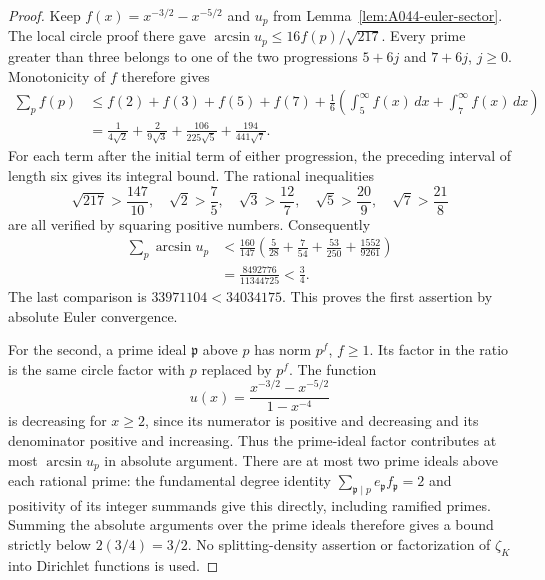 \begin{proof}
Keep \(f(x)=x^{-3/2}-x^{-5/2}\) and \(u_p\) from
Lemma~\ref{lem:A044-euler-sector}. The local circle proof there
gave \(\arcsin u_p\le16f(p)/\sqrt{217}\).
Every prime greater than three belongs to one of the two
progressions \(5+6j\) and \(7+6j\), \(j\ge0\).
Monotonicity of \(f\) therefore gives
\[
 \begin{aligned}
 \sum_p f(p)
 &\le f(2)+f(3)+f(5)+f(7)
        +\frac16\left(\int_5^\infty f(x)\,dx
                       +\int_7^\infty f(x)\,dx\right)\\
 &=\frac1{4\sqrt2}+\frac2{9\sqrt3}
          +\frac{106}{225\sqrt5}+\frac{194}{441\sqrt7}.
 \end{aligned}
\]
For each term after the initial term of either progression,
the preceding interval of length six gives its integral bound.
The rational inequalities
\[
 \sqrt{217}>\frac{147}{10},\quad
 \sqrt2>\frac75,\quad \sqrt3>\frac{12}{7},\quad
 \sqrt5>\frac{20}{9},\quad \sqrt7>\frac{21}{8}
\]
are all verified by squaring positive numbers. Consequently
\[
 \begin{aligned}
 \sum_p\arcsin u_p
 &<\frac{160}{147}
       \left(\frac5{28}+\frac7{54}
                     +\frac{53}{250}+\frac{1552}{9261}\right)\\
 &=\frac{8492776}{11344725}<\frac34.
 \end{aligned}
\]
The last comparison is \(33971104<34034175\).
This proves the first assertion by absolute Euler convergence.

For the second, a prime ideal \(\mathfrak p\) above \(p\) has
norm \(p^f\), \(f\ge1\). Its factor in the ratio is the same
circle factor with \(p\) replaced by \(p^f\).
The function
\[
 u(x)=\frac{x^{-3/2}-x^{-5/2}}{1-x^{-4}}
\]
is decreasing for \(x\ge2\), since its numerator is positive
and decreasing and its denominator positive and increasing.
Thus the prime-ideal factor contributes at most
\(\arcsin u_p\) in absolute argument.
There are at most two prime ideals above each rational prime:
the fundamental degree identity
\(\sum_{\mathfrak p\mid p}e_{\mathfrak p}f_{\mathfrak p}=2\)
and positivity of its integer summands give this directly,
including ramified primes. Summing the absolute arguments
over the prime ideals therefore gives a bound strictly below
\(2(3/4)=3/2\). No splitting-density assertion or factorization
of \(\zeta_K\) into Dirichlet functions is used.
\end{proof}

